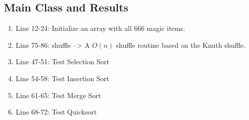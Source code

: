 \documentclass[letterpaper, 10pt,DIV=13]{scrartcl}
\numberwithin{equation}{section} %
\numberwithin{figure}{section} %
\numberwithin{table}{section} %
\begin{document}
\subsection{Main Class and Results}
\begin{enumerate}
    \item Line 12-24: Initialize an array with all 666 magic items.
    \item Line 75-86: shuffle --> A $O(n)$ shuffle routine based on the Knuth shuffle.
    \item Line 47-51: Test Selection Sort
    \item Line 54-58: Test Insertion Sort
    \item Line 61-65: Test Merge Sort
    \item Line 68-72: Test Quicksort
\end{enumerate}
\end{document}
